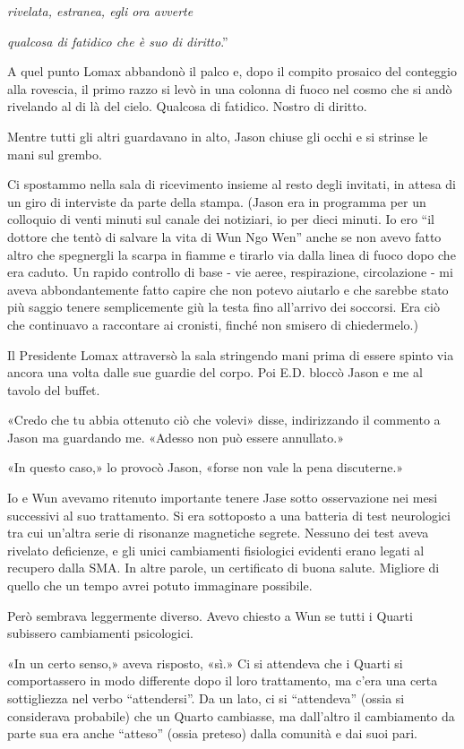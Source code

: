 \emph{rivelata, estranea, egli ora avverte}

\emph{qualcosa di fatidico che è suo di diritto}.''

A quel punto Lomax abbandonò il palco e, dopo il compito prosaico del
conteggio alla rovescia, il primo razzo si levò in una colonna di fuoco
nel cosmo che si andò rivelando al di là del cielo. Qualcosa di
fatidico. Nostro di diritto.

Mentre tutti gli altri guardavano in alto, Jason chiuse gli occhi e si
strinse le mani sul grembo.

\separatorefiori

Ci spostammo nella sala di ricevimento insieme al resto degli invitati,
in attesa di un giro di interviste da parte della stampa. (Jason era in
programma per un colloquio di venti minuti sul canale dei notiziari, io
per dieci minuti. Io ero ``il dottore che tentò di salvare la vita di
Wun Ngo Wen'' anche se non avevo fatto altro che spegnergli la scarpa in
fiamme e tirarlo via dalla linea di fuoco dopo che era caduto. Un rapido
controllo di base - vie aeree, respirazione, circolazione - mi aveva
abbondantemente fatto capire che non potevo aiutarlo e che sarebbe stato
più saggio tenere semplicemente giù la testa fino all'arrivo dei
soccorsi. Era ciò che continuavo a raccontare ai cronisti, finché non
smisero di chiedermelo.)

Il Presidente Lomax attraversò la sala stringendo mani prima di essere
spinto via ancora una volta dalle sue guardie del corpo. Poi E.D. bloccò
Jason e me al tavolo del buffet.

«Credo che tu abbia ottenuto ciò che volevi» disse, indirizzando il
commento a Jason ma guardando me. «Adesso non può essere annullato.»

«In questo caso,» lo provocò Jason, «forse non vale la pena discuterne.»

Io e Wun avevamo ritenuto importante tenere Jase sotto osservazione nei
mesi successivi al suo trattamento. Si era sottoposto a una batteria di
test neurologici tra cui un'altra serie di risonanze magnetiche segrete.
Nessuno dei test aveva rivelato deficienze, e gli unici cambiamenti
fisiologici evidenti erano legati al recupero dalla SMA. In altre
parole, un certificato di buona salute. Migliore di quello che un tempo
avrei potuto immaginare possibile.

Però sembrava leggermente diverso. Avevo chiesto a Wun se tutti i Quarti
subissero cambiamenti psicologici.

«In un certo senso,» aveva risposto, «sì.» Ci si attendeva che i Quarti
si comportassero in modo differente dopo il loro trattamento, ma c'era
una certa sottigliezza nel verbo ``attendersi''. Da un lato, ci si
``attendeva'' (ossia si considerava probabile) che un Quarto cambiasse,
ma dall'altro il cambiamento da parte sua era anche ``atteso'' (ossia
preteso) dalla comunità e dai suoi pari.

